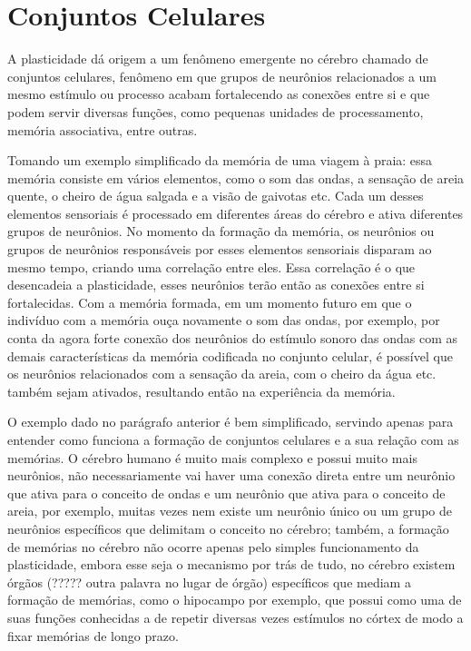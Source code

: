 \section{Conjuntos Celulares}

A plasticidade dá origem a um fenômeno emergente no cérebro chamado de conjuntos celulares, fenômeno em que grupos de neurônios relacionados
a um mesmo estímulo ou processo acabam fortalecendo as conexões entre si e que podem servir diversas funções, como pequenas unidades de
processamento, memória associativa, entre outras.

Tomando um exemplo simplificado da memória de uma viagem à praia: essa memória consiste em vários elementos, como o som das ondas,
a sensação de areia quente, o cheiro de água salgada e a visão de gaivotas etc. Cada um desses elementos sensoriais é processado em diferentes
áreas do cérebro e ativa diferentes grupos  de neurônios. No momento da formação da memória, os neurônios ou grupos de neurônios responsáveis
por esses elementos sensoriais disparam ao mesmo tempo, criando uma correlação entre eles. Essa correlação é o que desencadeia a plasticidade,
esses neurônios terão então as conexões entre si fortalecidas. Com a memória formada, em um momento futuro em que o indivíduo com a memória ouça
novamente o som das ondas, por exemplo, por conta da agora forte conexão dos neurônios do estímulo sonoro das ondas com as demais características
da memória codificada no conjunto celular, é possível que os neurônios relacionados com a sensação da areia, com o cheiro da água etc. também sejam
ativados, resultando então na experiência da memória.

O exemplo dado no parágrafo anterior é bem simplificado, servindo apenas para entender como funciona a formação de conjuntos celulares e a sua relação
com as memórias. O cérebro humano é muito mais complexo e possui muito mais neurônios, não necessariamente vai haver uma conexão direta entre um
neurônio que ativa para o conceito de ondas e um neurônio que ativa para o conceito de areia, por exemplo, muitas vezes nem existe um neurônio único
ou um grupo de neurônios específicos que delimitam o conceito no cérebro; também, a formação de memórias no cérebro não ocorre apenas pelo simples
funcionamento da plasticidade, embora esse seja o mecanismo por trás de tudo, no cérebro existem órgãos (????? outra palavra no lugar de órgão)
específicos que mediam a formação de memórias, como o hipocampo por exemplo, que possui como uma de suas funções conhecidas a de repetir diversas
vezes estímulos no córtex de modo a fixar memórias de longo prazo\cite{}.


